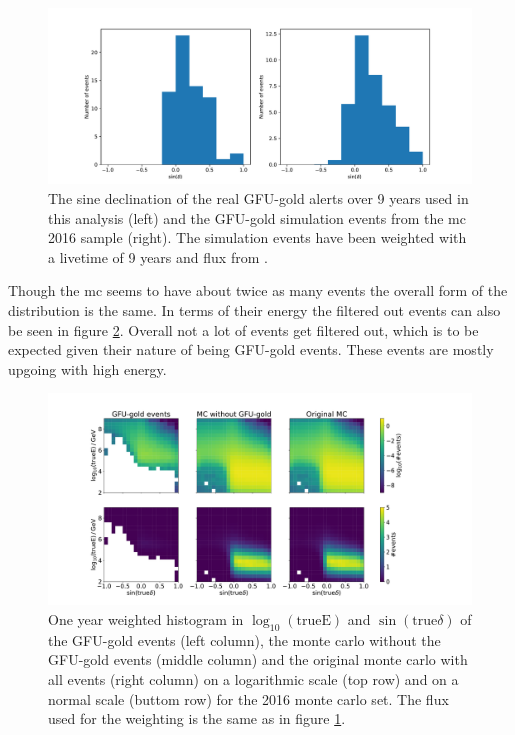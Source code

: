 \begin{figure}
    \centering
    \includegraphics[width=\linewidth]{Plots/03_data/gfu_gold_comp.pdf}
    \caption{The sine declination of the real GFU-gold alerts over 9 years used in this analysis (left) and the GFU-gold simulation events from the mc 2016 sample (right). The simulation events have been weighted with a livetime of 9 years and flux from \cite{flux}.}
    \label{fig:gfu_gold_comp}
\end{figure}
Though the mc seems to have about twice as many events the overall form of the distribution is the same.
In terms of their energy the filtered out events can also be seen in figure \ref{fig:energy}.
Overall not a lot of events get filtered out, which is to be expected given their nature of being GFU-gold events.
These events are mostly upgoing with high energy.
\begin{figure}
    \centering
    \includegraphics[width=\linewidth]{Plots/03_data/cleaned_mc_energy_test.pdf}
    \caption{One year weighted histogram in $\log_{10}(\text{trueE})$ and $\sin{(\text{true}\delta)}$ of the GFU-gold events (left column), the monte carlo without the GFU-gold events (middle column) and the original monte carlo with all events (right column) on a logarithmic scale (top row) and on a normal scale (buttom row) for the 2016 monte carlo set. The flux used for the weighting is the same as in figure \ref{fig:gfu_gold_comp}.}
    \label{fig:energy}
\end{figure}
